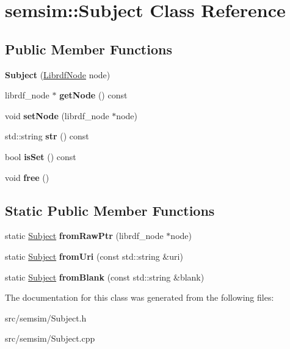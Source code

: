 \hypertarget{classsemsim_1_1Subject}{}\section{semsim\+:\+:Subject Class Reference}
\label{classsemsim_1_1Subject}
\subsection*{Public Member Functions}
\begin{DoxyCompactItemize}
\item 
\mbox{\label{classsemsim_1_1Subject_aa17c4b8d8a774d815129eb78ee9be4c6}} 
{\bfseries Subject} (\hyperlink{classredland_1_1LibrdfNode}{Librdf\+Node} node)
\item 
\mbox{\label{classsemsim_1_1Subject_a190fa201096714efe10354f73e340146}} 
librdf\+\_\+node $\ast$ {\bfseries get\+Node} () const
\item 
\mbox{\label{classsemsim_1_1Subject_affe03a33bb3ef32bce77e26b24f018f8}} 
void {\bfseries set\+Node} (librdf\+\_\+node $\ast$node)
\item 
\mbox{\label{classsemsim_1_1Subject_a4244a40a89fb9a3dd6ffff35cd95f7ca}} 
std\+::string {\bfseries str} () const
\item 
\mbox{\label{classsemsim_1_1Subject_aecfc41aed32eb5a2a5c5eadc814192d2}} 
bool {\bfseries is\+Set} () const
\item 
\mbox{\label{classsemsim_1_1Subject_ad522878616f2ed76b3a807b9374ea090}} 
void {\bfseries free} ()
\end{DoxyCompactItemize}
\subsection*{Static Public Member Functions}
\begin{DoxyCompactItemize}
\item 
\mbox{\label{classsemsim_1_1Subject_ad119bbf8b29abea7a23efc1df6268052}} 
static \hyperlink{classsemsim_1_1Subject}{Subject} {\bfseries from\+Raw\+Ptr} (librdf\+\_\+node $\ast$node)
\item 
\mbox{\label{classsemsim_1_1Subject_a180f5d9c5523f96711dd4bd363e0b60b}} 
static \hyperlink{classsemsim_1_1Subject}{Subject} {\bfseries from\+Uri} (const std\+::string \&uri)
\item 
\mbox{\label{classsemsim_1_1Subject_a3a117e493ff15d93414016bb2d8730ec}} 
static \hyperlink{classsemsim_1_1Subject}{Subject} {\bfseries from\+Blank} (const std\+::string \&blank)
\end{DoxyCompactItemize}


The documentation for this class was generated from the following files\+:\begin{DoxyCompactItemize}
\item 
src/semsim/Subject.\+h\item 
src/semsim/Subject.\+cpp\end{DoxyCompactItemize}
